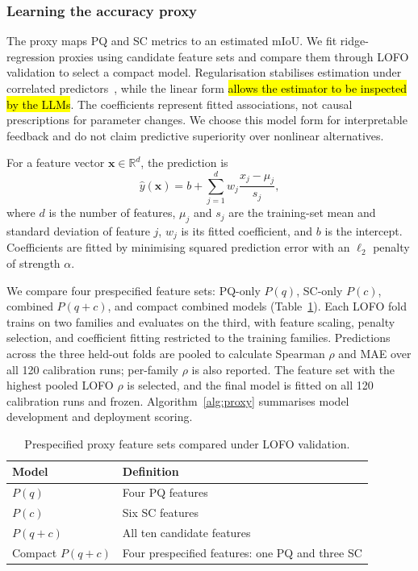 \documentclass[a4paper,fleqn]{cas-dc}
\begin{document}
{\subsubsection{Learning the accuracy proxy}
\label{sec:ridge-proxy}

The proxy maps PQ and SC metrics to an estimated mIoU. We fit ridge-regression proxies using candidate feature sets and compare them through LOFO validation to select a compact model. Regularisation stabilises estimation under correlated predictors~\cite{hoerl1970ridge,pedregosa2011sklearn}, while the linear form \hl{allows the estimator to be inspected by the LLMs}. The coefficients represent fitted associations, not causal prescriptions for parameter changes. We choose this model form for interpretable feedback and do not claim predictive superiority over nonlinear alternatives.

For a feature vector $\mathbf{x}\in\mathbb{R}^{d}$, the prediction is
\begin{equation}
\hat{y}(\mathbf{x})
=
b+\sum_{j=1}^{d}
w_j\frac{x_j-\mu_j}{s_j},
\label{eq:ridge-proxy}
\end{equation}
where $d$ is the number of features, $\mu_j$ and $s_j$ are the training-set mean and standard deviation of feature $j$, $w_j$ is its fitted coefficient, and $b$ is the intercept. Coefficients are fitted by minimising squared prediction error with an $\ell_2$ penalty of strength $\alpha$.

We compare four prespecified feature sets: PQ-only $P(q)$, SC-only $P(c)$, combined $P(q{+}c)$, and compact combined models (Table~\ref{tab:proxy-ablation}). Each LOFO fold trains on two families and evaluates on the third, with feature scaling, penalty selection, and coefficient fitting restricted to the training families. Predictions across the three held-out folds are pooled to calculate Spearman $\rho$ and MAE over all 120 calibration runs; per-family $\rho$ is also reported. The feature set with the highest pooled LOFO $\rho$ is selected, and the final model is fitted on all 120 calibration runs and frozen. Algorithm~\ref{alg:proxy} summarises model development and deployment scoring.

\begin{table}[ht]
\caption{Prespecified proxy feature sets compared under LOFO validation.}
\label{tab:proxy-ablation}
\centering
\begin{tabular}{p{} p{}}
\toprule
Model & Definition \\
\midrule
$P(q)$ & Four PQ features \\
$P(c)$ & Six SC features \\
$P(q{+}c)$ & All ten candidate features \\
Compact $P(q{+}c)$ & Four prespecified features: one PQ and three SC \\
\bottomrule
\end{tabular}
\end{table}

}
\end{document}
